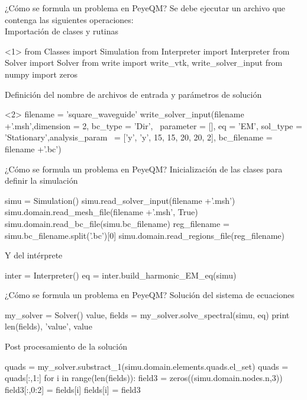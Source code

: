 \documentclass[xcolor=table,serif,handout]{beamer}
\begin{document}
	\begin{frame}[fragile]{¿Cómo se formula un problema en PeyeQM?}
	Se debe ejecutar un archivo que contenga las siguientes operaciones:\\
		\pause
		Importación de clases y rutinas
		\begin{python}<1>
		from Classes import Simulation
		from Interpreter import Interpreter
		from Solver import Solver
		from write import write_vtk, write_solver_input 
		from numpy import zeros
		\end{python}	
		\pause 
		Definición del nombre de archivos de entrada y parámetros de solución
		\begin{python}<2>
	filename = 'square_waveguide'
	write_solver_input(filename +'.msh',dimension = 2, bc_type = 		'Dir', \
	parameter = [], eq = 'EM', sol_type = 'Stationary',analysis_param \
	= ['y', 'y', 15, 15, 20, 20, 2], bc_filename = filename +'.bc')  
		\end{python}
	\end{frame}
	\begin{frame}[fragile]{¿Cómo se formula un problema en PeyeQM?}
	Inicialización de las clases para definir la simulación
	\begin{python}
simu = Simulation()
simu.read_solver_input(filename +'.msh')
simu.domain.read_mesh_file(filename +'.msh', True)
simu.domain.read_bc_file(simu.bc_filename)
reg_filename = simu.bc_filename.split('.bc')[0]
simu.domain.read_regions_file(reg_filename)
	\end{python}
	\pause
	Y del intérprete
	\begin{python}
inter = Interpreter()
eq = inter.build_harmonic_EM_eq(simu)
	\end{python}	
	
	\end{frame}
	\begin{frame}[fragile]{¿Cómo se formula un problema en PeyeQM?}
	Solución del sistema de ecuaciones	
	\begin{python}
	my_solver = Solver()
value, fields = my_solver.solve_spectral(simu, eq)
print len(fields), 'value', value
	\end{python}
	\pause
	Post procesamiento de la solución
	\begin{python}
quads = my_solver.substract_1(simu.domain.elements.quads.el_set)
quads = quads[:,1:]
for i in range(len(fields)):
    field3 =  zeros((simu.domain.nodes.n,3))
    field3[:,0:2] = fields[i]
    fields[i] = field3
	\end{python}
	\end{frame}
\end{document}

